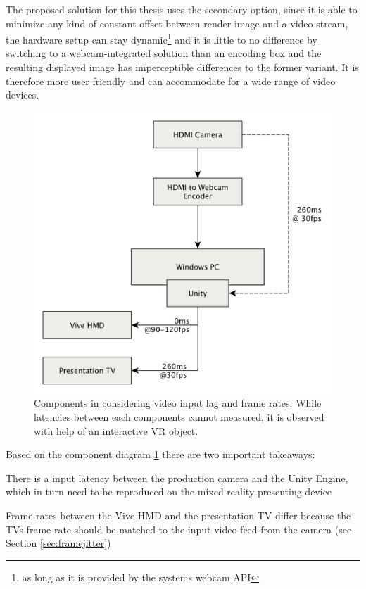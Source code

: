 The proposed solution for this thesis uses the secondary option, since it is 
able to minimize any kind of constant offset between render image and a video 
stream, the hardware setup can stay dynamic\footnote{as long as it is provided 
by the systems webcam API} and it is little to no difference by switching to a 
webcam-integrated solution than an encoding box and the resulting displayed 
image has imperceptible differences to the former variant. It is therefore more 
user friendly and can accommodate for a wide range of video devices.

\begin{figure}[htb]
	\includegraphics[width=\textwidth]{gfx/FPS-Timing-Components.png}
	\caption{Components in considering video input lag and frame rates. While 
	latencies between each components cannot measured, it is observed with help 
	of an interactive VR object.}
	\label{fig:offsets:components}
\end{figure}


Based on the component diagram \ref{fig:offsets:components} there are two 
important takeaways: 

\begin{my_list}
	\item There is a input latency between the production camera and the Unity 
	Engine, which in turn need to be reproduced on the mixed reality presenting 
	device
	\item Frame rates between the Vive HMD and the presentation TV differ 
	because the TVs frame rate should be matched to the input video feed from 
	the camera (see Section \ref{sec:framejitter})
\end{my_list}


